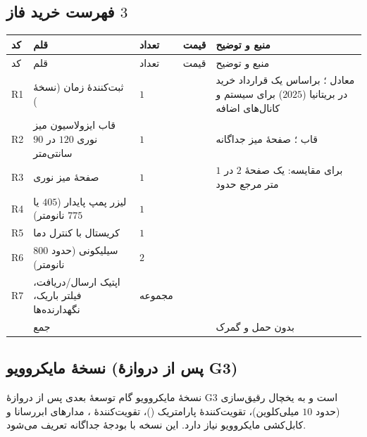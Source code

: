 \subsection{فهرست خرید فاز $3$}
\label{sub:p3buy}
\begin{longtable}{C{0.88cm}R{5.47cm}C{0.78cm}C{2.44cm}R{4.59cm}}
\toprule {} کد & قلم & تعداد & قیمت & منبع و توضیح \\ \midrule
\endfirsthead
\toprule {} کد & قلم & تعداد & قیمت & منبع و توضیح \\ \midrule
\endhead
R1 & ثبت‌کنندهٔ زمان  (نسخهٔ ) & $1$ &  & معادل ؛ براساس یک قرارداد خرید در بریتانیا ($2025$) برای سیستم و کانال‌های اضافه \\
R2 & قاب ایزولاسیون میز نوری $120$ در $90$ سانتی‌متر & $1$ &  & قاب ؛ صفحهٔ میز جداگانه \\
R3 & صفحهٔ میز نوری & $1$ &  & برای مقایسه: یک صفحهٔ $2$ در $1$ متر مرجع حدود  \\
R4 & لیزر پمپ پایدار ($405$ یا $775$ نانومتر) & $1$ &  & \lr{--} \\
R5 & کریستال  با کنترل دما & $1$ &  & \lr{--} \\
R6 &  سیلیکونی (حدود $800$ نانومتر) & $2$ &  & \lr{--} \\
R7 & اپتیک ارسال/دریافت، فیلتر باریک، نگهدارنده‌ها & مجموعه &  & \lr{--} \\
\midrule & جمع &  &  & بدون حمل و گمرک \\
\bottomrule\end{longtable}

\subsection{نسخهٔ مایکروویو (پس از دروازهٔ G3)}
نسخهٔ مایکروویو گام توسعهٔ بعدی پس از دروازهٔ G3 است و به یخچال رقیق‌سازی (حدود $10$ میلی‌کلوین)، تقویت‌کنندهٔ پارامتریک ()، تقویت‌کنندهٔ ، مدارهای ابررسانا و کابل‌کشی مایکروویو نیاز دارد. این نسخه با بودجهٔ جداگانه تعریف می‌شود\cite{barzanjeh}.

